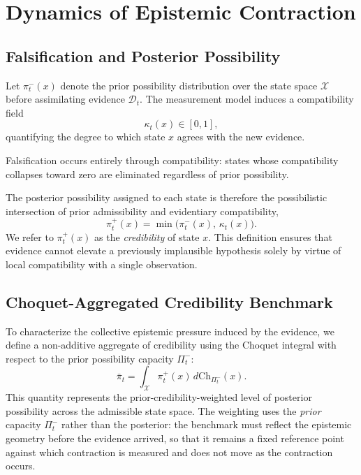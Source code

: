 \documentclass[12pt]{article}
\newcommand{\calX}{\mathcal{X}}
\begin{document}
\section{Dynamics of Epistemic Contraction}
\label{sec:dynamics}

\subsection{Falsification and Posterior Possibility}

Let $\pi^-_t(x)$ denote the prior possibility distribution over the state space
$\calX$ before assimilating evidence $\mathcal{D}_t$. The measurement model induces
a compatibility field
\[
\kappa_t(x) \in [0,1],
\]
quantifying the degree to which state $x$ agrees with the new evidence.

Falsification occurs entirely through compatibility: states whose compatibility
collapses toward zero are eliminated regardless of prior possibility.

The posterior possibility assigned to each state is therefore the possibilistic
intersection of prior admissibility and evidentiary compatibility,
\begin{equation}
\pi^+_t(x) = \min\!\bigl(\pi^-_t(x),\,\kappa_t(x)\bigr).
\label{eq:posterior}
\end{equation}
We refer to $\pi^+_t(x)$ as the \emph{credibility} of state $x$. This definition
ensures that evidence cannot elevate a previously implausible hypothesis solely
by virtue of local compatibility with a single observation.

\subsection{Choquet-Aggregated Credibility Benchmark}

To characterize the collective epistemic pressure induced by the evidence, we
define a non-additive aggregate of credibility using the Choquet integral with
respect to the prior possibility capacity $\Pi^-_t$:
\begin{equation}
\bar{\pi}_t = \int_\calX \pi^+_t(x)\,d\mathrm{Ch}_{\Pi^-_t}(x).
\label{eq:benchmark}
\end{equation}
This quantity represents the prior-credibility-weighted level of posterior
possibility across the admissible state space. The weighting uses the \emph{prior}
capacity $\Pi^-_t$ rather than the posterior: the benchmark must reflect the
epistemic geometry before the evidence arrived, so that it remains a fixed
reference point against which contraction is measured and does not move as the
contraction occurs.
\end{document}
